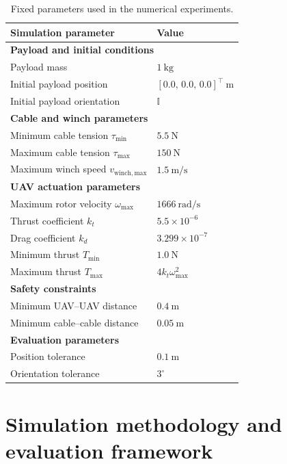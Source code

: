 \begin{table}
\centering
\small
\renewcommand{\arraystretch}{0.85}
\begin{tabular}{ll}
\toprule
\textbf{Simulation parameter} & \textbf{Value} \\
\midrule
\multicolumn{2}{l}{\textbf{Payload and initial conditions}} \\
\midrule
Payload mass & $1~\mathrm{kg}$ \\
Initial payload position & $[0.0,\,0.0,\,0.0]^\top~\mathrm{m}$ \\
Initial payload orientation & $\mathbb{I}$ \\
\midrule
\multicolumn{2}{l}{\textbf{Cable and winch parameters}} \\
\midrule
Minimum cable tension $\tau_{\min}$ & $5.5~\mathrm{N}$ \\
Maximum cable tension $\tau_{\max}$ & $150~\mathrm{N}$ \\
Maximum winch speed $v_{\mathrm{winch,max}}$ & $1.5~\mathrm{m/s}$ \\
\midrule
\multicolumn{2}{l}{\textbf{UAV actuation parameters}} \\
\midrule
Maximum rotor velocity $\omega_{\max}$ & $1666~\mathrm{rad/s}$ \\
Thrust coefficient $k_t$ & $5.5\times10^{-6}$ \\
Drag coefficient $k_d$ & $3.299\times10^{-7}$ \\
Minimum thrust $T_{\min}$ & $1.0~\mathrm{N}$ \\
Maximum thrust $T_{\max}$ & $4k_t\omega_{\max}^2$ \\
\midrule
\multicolumn{2}{l}{\textbf{Safety constraints}} \\
\midrule
Minimum UAV--UAV distance & $0.4~\mathrm{m}$ \\
Minimum cable--cable distance & $0.05~\mathrm{m}$ \\
\midrule
\multicolumn{2}{l}{\textbf{Evaluation parameters}} \\
\midrule
Position tolerance & $0.1~\mathrm{m}$ \\
Orientation tolerance & $3^\circ$ \\
\bottomrule
\end{tabular}
\caption{Fixed parameters used in the numerical experiments.}
\label{tab:simulation_parameters}
\end{table}

\section{Simulation methodology and evaluation framework}

